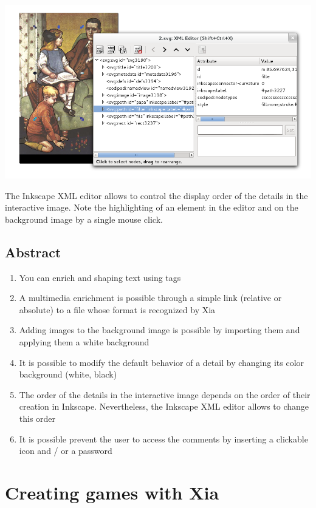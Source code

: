 \begin{center}
 \includegraphics[width=\textwidth]{images/layerorder}\\
\end{center}
 
 The Inkscape XML editor allows to control the display order of the details 
in the interactive image. Note the highlighting of an element  
in the editor and on the background image by a single mouse click.

\subsection{Abstract}

\begin{enumerate}
 \item You can enrich and shaping text using tags
 \item A multimedia enrichment is possible through a simple link (relative
or absolute) to a file whose format is recognized by Xia
 \item Adding images to the background image is possible by importing them and applying them a white background
 \item It is possible to modify the default behavior of a detail by changing its color 
background (white, black)
 \item The order of the details in the interactive image depends on the order
of their creation in Inkscape. Nevertheless, the Inkscape XML editor allows to change this order
\item It is possible prevent the user to access the comments by inserting a clickable icon and / or a password
\end{enumerate}

\newpage

\section{Creating games with Xia}\label{games_IA}

